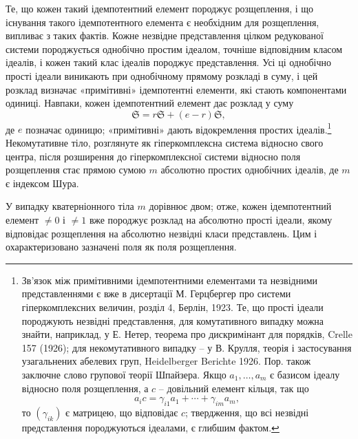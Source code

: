 \documentclass[11pt]{article}
\newcommand{\mS}{\mathfrak{S}}
\begin{document}
\noindent Те, що кожен такий ідемпотентний елемент породжує розщеплення, і що існування такого ідемпотентного елемента є необхідним для розщеплення, випливає з таких фактів. Кожне незвідне представлення цілком редукованої системи породжується однобічно простим ідеалом, точніше відповідним класом ідеалів, і кожен такий клас ідеалів породжує представлення. Усі ці однобічно прості ідеали виникають при однобічному прямому розкладі в суму, і цей розклад визначає «примітивні» ідемпотентні елементи, які стають компонентами одиниці. Навпаки, кожен ідемпотентний елемент дає розклад у суму
\[
        \mS=r\mS+(e-r)\mS,
\]
де $e$ позначає одиницю; «примітивні» дають відокремлення простих ідеалів.\footnote{Зв'язок між примітивними ідемпотентними елементами та незвідними представленнями є вже в дисертації М. Герцбергер про системи гіперкомплексних величин, розділ 4, Берлін, 1923. Те, що прості ідеали породжують незвідні представлення, для комутативного випадку можна знайти, наприклад, у Е. Нетер, теорема про дискримінант для порядків, Crelle 157 (1926); для некомутативного випадку -- у В. Крулля, теорія і застосування узагальнених абелевих груп, Heidelberger Berichte 1926. Пор. також заключне слово групової теорії Шпайзера. Якщо $a_1,\ldots,a_m$ є базисом ідеалу відносно поля розщеплення, а $c$ -- довільний елемент кільця, так що
\[
        a_i c=\gamma_{i1}a_1+\cdots+\gamma_{im}a_m,
\]
то $(\gamma_{ik})$ є матрицею, що відповідає $c$; твердження, що всі незвідні представлення породжуються ідеалами, є глибшим фактом.} Некомутативне тіло, розглянуте як гіперкомплексна система відносно свого центра, після розширення до гіперкомплексної системи відносно поля розщеплення стає прямою сумою $m$ абсолютно простих однобічних ідеалів, де $m$ є індексом Шура.

\medskip

\noindent У випадку кватерніонного тіла $m$ дорівнює двом; отже, кожен ідемпотентний елемент $\ne0$ і $\ne1$ вже породжує розклад на абсолютно прості ідеали, якому відповідає розщеплення на абсолютно незвідні класи представлень. Цим і охарактеризовано зазначені поля як поля розщеплення.
\end{document}
